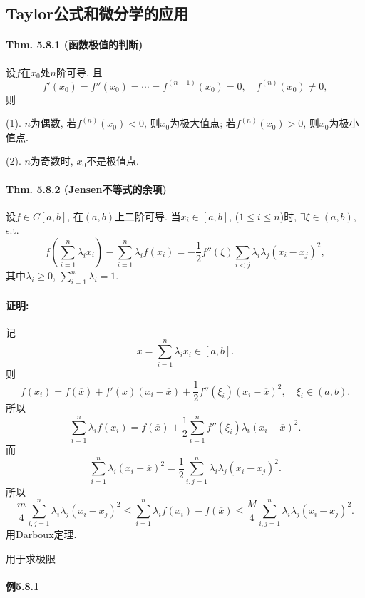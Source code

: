 \subsection{Taylor公式和微分学的应用}

\paragraph{Thm. 5.8.1 (函数极值的判断)}

设$f$在$x_{0}$处$n$阶可导, 且
\[
f'(x_{0})=f''(x_{0})=\cdots=f^{(n-1)}(x_{0})=0,\quad f^{(n)}(x_{0})\ne0,
\]
则

(1). $n$为偶数, 若$f^{(n)}(x_{0})<0$, 则$x_{0}$为极大值点; 若$f^{(n)}(x_{0})>0$,
则$x_{0}$为极小值点.

(2). $n$为奇数时, $x_{0}$不是极值点.

\paragraph{Thm. 5.8.2 (Jensen不等式的余项)}

设$f\in C[a,b]$, 在$(a,b)$上二阶可导. 当$x_{i}\in[a,b]$, ($1\le i\le n$)时,
$\exists\xi\in(a,b)$, s.t.
\[
f\left(\sum_{i=1}^{n}\lambda_{i}x_{i}\right)-\sum_{i=1}^{n}\lambda_{i}f(x_{i})=-\frac{1}{2}f''(\xi)\sum_{i<j}\lambda_{i}\lambda_{j}(x_{i}-x_{j})^{2},
\]
其中$\lambda_{i}\ge0$, $\sum_{i=1}^{n}\lambda_{i}=1$.

\paragraph{证明: }

记
\[
\overline{x}=\sum_{i=1}^{n}\lambda_{i}x_{i}\in[a,b].
\]
则
\[
f(x_{i})=f(\overline{x})+f'(x)(x_{i}-\overline{x})+\frac{1}{2}f''(\xi_{i})(x_{i}-\overline{x})^{2},\quad\xi_{i}\in(a,b).
\]
所以
\[
\sum_{i=1}^{n}\lambda_{i}f(x_{i})=f(\overline{x})+\frac{1}{2}\sum_{i=1}^{n}f''(\xi_{i})\lambda_{i}(x_{i}-\overline{x})^{2}.
\]
而
\[
\sum_{i=1}^{n}\lambda_{i}(x_{i}-\overline{x})^{2}=\frac{1}{2}\sum_{i,j=1}^{n}\lambda_{i}\lambda_{j}(x_{i}-x_{j})^{2}.
\]
所以
\[
\frac{m}{4}\sum_{i,j=1}^{n}\lambda_{i}\lambda_{j}(x_{i}-x_{j})^{2}\le\sum_{i=1}^{n}\lambda_{i}f(x_{i})-f(\overline{x})\le\frac{M}{4}\sum_{i,j=1}^{n}\lambda_{i}\lambda_{j}(x_{i}-x_{j})^{2}.
\]
用Darboux定理.

用于求极限

\paragraph{例5.8.1}

